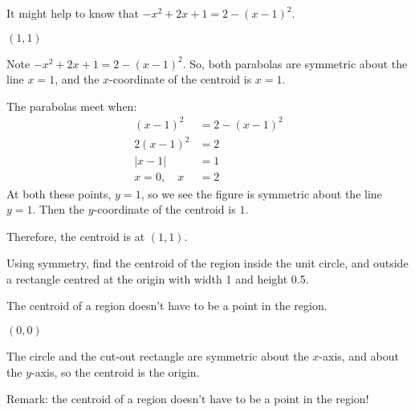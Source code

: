 \begin{hint}
It might help to know that $-x^2+2x+1 = 2-(x-1)^2$.
\end{hint}
\begin{answer}
$(1,1)$
\end{answer}
\begin{solution}
Note $-x^2+2x+1 = 2-(x-1)^2$. So,
both parabolas are symmetric about the line $x=1$, and the $x$-coordinate of the centroid is $x=1$.
\begin{center}
\end{center}
The parabolas meet when:
\begin{align*}
(x-1)^2&=2-(x-1)^2\\
2(x-1)^2&=2\\
|x-1|&=1\\
x=0,\quad x&=2
\end{align*}
At both these points, $y=1$, so we see the figure is symmetric about the line $y=1$. Then the $y$-coordinate of the centroid is $1$.

\begin{center}
\end{center}

Therefore, the centroid is at $(1,1)$.
\end{solution}
\begin{question}
Using symmetry, find the centroid of the region inside the unit circle, and outside a rectangle centred at the origin with width 1 and height 0.5.
\begin{center}
\end{center}
\end{question}
\begin{hint}
The centroid of a region doesn't have to be a point in the region.
\end{hint}
\begin{answer}
$(0,0)$
\end{answer}
\begin{solution}
The circle and the cut-out rectangle are symmetric about the $x$-axis, and about the $y$-axis, so the centroid is the origin.

Remark: the centroid of a region doesn't have to be a point in the region!
\end{solution}

